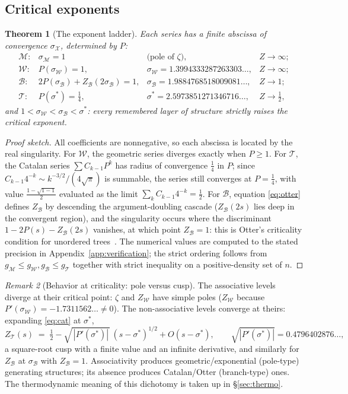 \documentclass[11pt]{article}
\newcommand{\cT}{\mathcal{T}}   %
\newcommand{\cW}{\mathcal{W}}   %
\newcommand{\cB}{\mathcal{B}}   %
\newcommand{\cM}{\mathcal{M}}   %
\numberwithin{equation}{section}
\theoremstyle{plain}
\newtheorem{theorem}{Theorem}[section]
\theoremstyle{definition}
\theoremstyle{remark}
\newtheorem{remark}[theorem]{Remark}
\begin{document}
\subsection{Critical exponents}

\begin{theorem}[The exponent ladder]\label{thm:ladder}
Each series has a finite abscissa of convergence $\sigma_{\mathcal X}$, determined by
$P$:
\[
\begin{array}{llll}
\cM: & \sigma_\cM = 1 & \text{(pole of } \zeta), & Z \to \infty; \\[0.5mm]
\cW: & P(\sigma_\cW) = 1, & \sigma_\cW = 1.3994333287263303\dots, & Z \to \infty; \\[0.5mm]
\cB: & 2P(\sigma_\cB) + Z_\cB(2\sigma_\cB) = 1, & \sigma_\cB = 1.9884768518009081\dots, & Z \to 1; \\[0.5mm]
\cT: & P(\sigma^{*}) = \tfrac14, & \sigma^{*} = 2.5973851271346716\dots, & Z \to \tfrac12,
\end{array}
\]
and $1 < \sigma_\cW < \sigma_\cB < \sigma^{*}$: every remembered layer of structure
strictly raises the critical exponent.
\end{theorem}

\begin{proof}[Proof sketch]
All coefficients are nonnegative, so each abscissa is located by the real singularity.
For $\cW$, the geometric series diverges exactly when $P \ge 1$. For $\cT$, the Catalan
series $\sum C_{k-1}P^k$ has radius of convergence $\tfrac14$ in $P$; since
$C_{k-1}4^{-k} \sim k^{-3/2}/(4\sqrt{\pi})$ is summable, the series still converges at
$P = \tfrac14$, with value $\tfrac{1-\sqrt{1-1}}{2}$ evaluated as the limit
$\sum_k C_{k-1}4^{-k} = \tfrac12$. For $\cB$, equation \eqref{eq:otter} defines $Z_\cB$
by descending the argument-doubling cascade ($Z_\cB(2s)$ lies deep in the convergent
region), and the singularity occurs where the discriminant $1 - 2P(s) - Z_\cB(2s)$
vanishes, at which point $Z_\cB = 1$: this is Otter's criticality condition for
unordered trees~\cite{otter,flajolet}. The numerical values are computed to the stated
precision in Appendix~\ref{app:verification}; the strict ordering follows from
$g_\cM \le g_\cW, g_\cB \le g_\cT$ together with strict inequality on a positive-density
set of $n$.
\end{proof}

\begin{remark}[Behavior at criticality: pole versus cusp]\label{rem:cusp}
The associative levels diverge at their critical point: $\zeta$ and $Z_\cW$ have simple
poles ($Z_\cW$ because $P'(\sigma_\cW) = -1.7311562\dots \ne 0$). The non-associative
levels converge at theirs: expanding \eqref{eq:cat} at $\sigma^{*}$,
\[
Z_\cT(s) \;=\; \tfrac12 - \sqrt{\,|P'(\sigma^{*})|\,}\,(s-\sigma^{*})^{1/2} + O(s-\sigma^{*}),
\qquad \sqrt{|P'(\sigma^{*})|} = 0.4796402876\dots,
\]
a square-root cusp with a finite value and an infinite derivative, and similarly for
$Z_\cB$ at $\sigma_\cB$ with $Z_\cB = 1$. Associativity produces geometric/exponential
(pole-type) generating structures; its absence produces Catalan/Otter (branch-type)
ones. The thermodynamic meaning of this dichotomy is taken up in \S\ref{sec:thermo}.
\end{remark}
\end{document}
